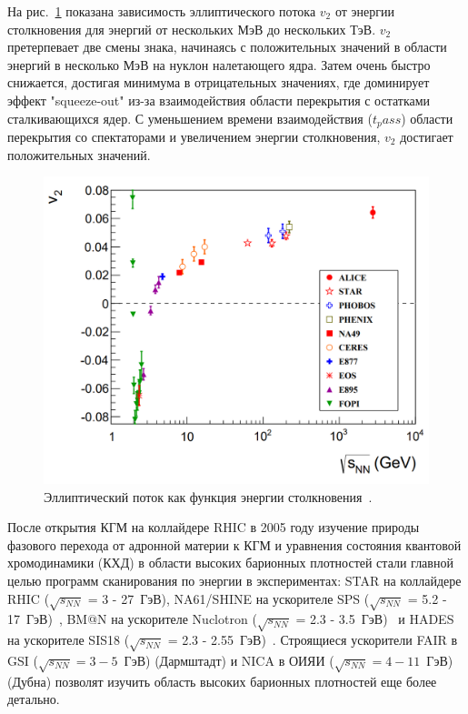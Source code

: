 На рис.~\ref{fig:v2_energy} показана зависимость эллиптического потока $v_2$ от энергии столкновения для энергий от нескольких МэВ до нескольких ТэВ.
$v_2$ претерпевает две смены знака, начинаясь с положительных значений в области энергий в несколько МэВ на нуклон налетающего ядра. 
Затем очень быстро снижается, достигая минимума в отрицательных значениях, где доминирует эффект "squeeze-out" из-за взаимодействия области перекрытия с остатками сталкивающихся ядер.
С уменьшением времени взаимодействия ($t_pass$) области перекрытия со спектаторами и увеличением энергии столкновения, $v_2$ достигает положительных значений. 
\begin{figure}
    \centering
    \includegraphics[width=0.5\linewidth]{images/v2_energy.png}
    \caption{Эллиптический поток как функция энергии столкновения~\cite{stock2004relativistic}.}
    \label{fig:v2_energy}
\end{figure}

После открытия КГМ на коллайдере RHIC в 2005 году изучение природы фазового перехода от адронной материи к КГМ и уравнения состояния  квантовой хромодинамики (КХД) в области высоких барионных плотностей стали главной целью программ сканирования по энергии в экспериментах: STAR на коллайдере RHIC ($\sqrt{s_{NN}}$ = 3 - 27~ГэВ), NA61/SHINE на ускорителе  SPS ($\sqrt{s_{NN}}$ = 5.2 - 17~ГэВ)~\cite{NA61:2014lfx}, BM@N на ускорителе Nuclotron ($\sqrt{s_{NN}}$ = 2.3 - 3.5~ГэВ)~\cite{Senger:2022bzm} и   HADES на ускорителе  SIS18 ($\sqrt{s_{NN}}$ = 2.3 - 2.55~ГэВ)~\cite{HADES:2009aat}. 
Строящиеся ускорители FAIR в GSI ($\sqrt{s_{NN}}=3-5$~ГэВ) (Дармштадт) и NICA в ОИЯИ ($\sqrt{s_{NN}}=4-11$~ГэВ) (Дубна) позволят изучить  область высоких барионных плотностей еще более детально.

